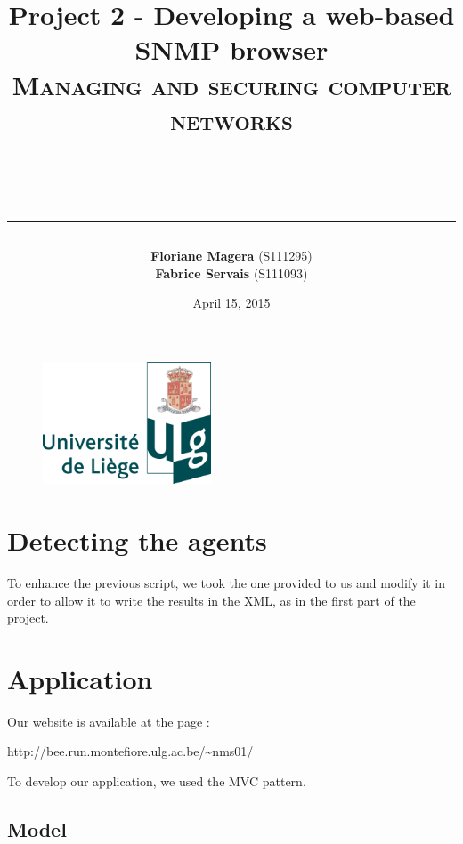 \documentclass[a4paper,titlepage]{article}
\begin{document}
\begin{titlepage}

\begin{figure}
\centering
\includegraphics[width=5cm]{logo-ulg.png}
\end{figure}



\title{
\vspace{0.2cm}
\LARGE{\textbf{Project 2 - Developing a web-based SNMP browser }} \\ \textsc{Managing and securing computer networks}
\author{\textbf{Floriane Magera} \small{(S111295})\\\textbf{Fabrice Servais} \small{(S111093})}\\
\date{April 15, 2015}
\rule{15cm}{1.5pt}
}

\end{titlepage}

\pagestyle{fancy}

\maketitle

\section{Detecting the agents}
To enhance the previous script, we took the one provided to us and modify it in order to allow it to write the results in the XML, as in the first part of the project.

\section{Application}
Our website is available at the page : 
\begin{center}
	http://bee.run.montefiore.ulg.ac.be/\textasciitilde nms01/
\end{center}
To develop our application, we used the MVC pattern.

\subsection{Model}
\end{document}
